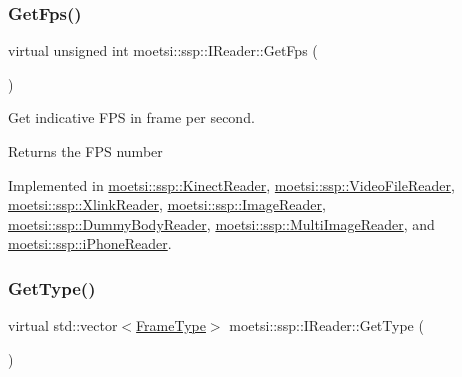 \mbox{\label{classmoetsi_1_1ssp_1_1IReader_a9f6a8650ca290b011b8e5451eeae9f32}} 
\subsubsection{\texorpdfstring{Get\+Fps()}{GetFps()}\hspace{0.1cm}{\footnotesize\ttfamily [2/2]}}
{\footnotesize\ttfamily virtual unsigned int moetsi\+::ssp\+::\+I\+Reader\+::\+Get\+Fps (\begin{DoxyParamCaption}{ }\end{DoxyParamCaption})\hspace{0.3cm}{\ttfamily [pure virtual]}}



Get indicative F\+PS in frame per second. 

\begin{DoxyReturn}{Returns}
the F\+PS number 
\end{DoxyReturn}


Implemented in \hyperlink{classmoetsi_1_1ssp_1_1KinectReader_ac88c13693ce8e2e249438ac8de8a7b3c}{moetsi\+::ssp\+::\+Kinect\+Reader}, \hyperlink{classmoetsi_1_1ssp_1_1VideoFileReader_a83359ad82898acdb75240568b182247c}{moetsi\+::ssp\+::\+Video\+File\+Reader}, \hyperlink{classmoetsi_1_1ssp_1_1XlinkReader_accfec6799b561107f27240e5324aa5d4}{moetsi\+::ssp\+::\+Xlink\+Reader}, \hyperlink{classmoetsi_1_1ssp_1_1ImageReader_a86adfec8106c366aaf1ec63e2a7da156}{moetsi\+::ssp\+::\+Image\+Reader}, \hyperlink{classmoetsi_1_1ssp_1_1DummyBodyReader_a7dab48cb8ec247add0c57d98e6cd5fb4}{moetsi\+::ssp\+::\+Dummy\+Body\+Reader}, \hyperlink{classmoetsi_1_1ssp_1_1MultiImageReader_ad0a249af66f8e1a063c3e575fc1b94cb}{moetsi\+::ssp\+::\+Multi\+Image\+Reader}, and \hyperlink{classmoetsi_1_1ssp_1_1iPhoneReader_a4bb216847a6c2ed8eb5d31788a0b8477}{moetsi\+::ssp\+::i\+Phone\+Reader}.

\mbox{\label{classmoetsi_1_1ssp_1_1IReader_a4116c1931fde7bd66133934ffdca1cce}} 
\subsubsection{\texorpdfstring{Get\+Type()}{GetType()}\hspace{0.1cm}{\footnotesize\ttfamily [1/2]}}
{\footnotesize\ttfamily virtual std\+::vector$<$\hyperlink{namespacemoetsi_1_1ssp_a46efdfa2cd5a28ead465dcc8006b5a87}{Frame\+Type}$>$ moetsi\+::ssp\+::\+I\+Reader\+::\+Get\+Type (\begin{DoxyParamCaption}{ }\end{DoxyParamCaption})\hspace{0.3cm}{\ttfamily [pure virtual]}}



